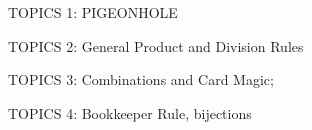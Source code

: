 \documentclass[handout]{mcs}
\begin{document}
\renewcommand{\reading}{
  Notes Ch.\bref{why_count_sec}--\bref{poker hands}
}



\begin{staffnotes}
  TOPICS 1: PIGEONHOLE
\end{staffnotes}


\begin{staffnotes}
TOPICS 2: General Product and Division Rules 
\end{staffnotes}


\begin{staffnotes}
TOPICS 3: Combinations and Card Magic; 
\end{staffnotes}

\begin{staffnotes}
TOPICS 4: Bookkeeper Rule, bijections
\end{staffnotes}


\end{document}
